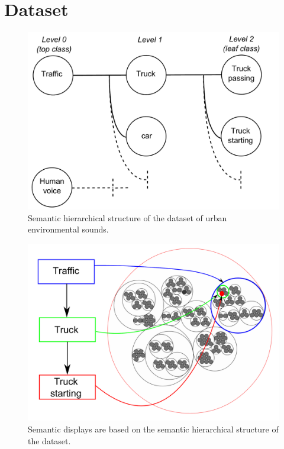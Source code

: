 \documentclass{aes2e}
\begin{document}
\section{Dataset} \label{dataset}


\begin{figure}[t]
\begin{center}
\includegraphics[scale=0.24]{gfx/dataset.pdf} 
\end{center}
\caption{\label{figdataset} Semantic hierarchical structure of the dataset of urban environmental sounds.}
\end{figure}

\begin{figure}[t]
\begin{center}
\includegraphics[scale=0.24]{gfx/SSF.pdf} 
\end{center}
\caption{\label{figSSF} Semantic displays are  based on the semantic hierarchical structure of the dataset.}
\end{figure}
\end{document}
